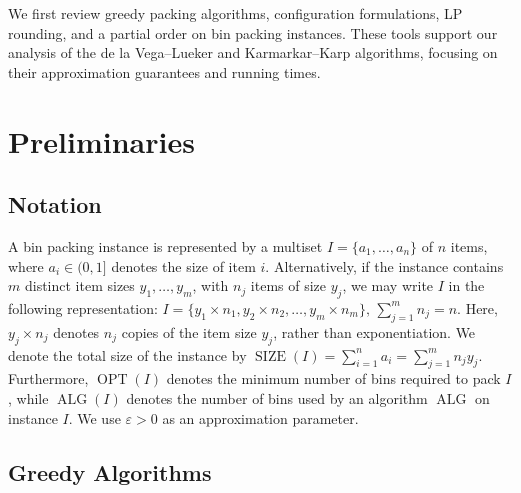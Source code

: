 \documentclass[11pt,a4paper,onecolumn]{article}
\theoremstyle{plain}
\newtheorem{theorem}{Theorem}[section]
\theoremstyle{definition}
\newtheorem{definition}[theorem]{Definition}
\theoremstyle{remark}
\newcommand{\eps}{\varepsilon}
\newcommand{\I}{\mathcal{I}}
\DeclareMathOperator{\OPT}{OPT}
\DeclareMathOperator{\ALG}{ALG}
\DeclareMathOperator{\SIZE}{SIZE}
\begin{document}
We first review greedy packing algorithms, configuration formulations,
LP rounding, and a partial order on bin packing instances. These tools
support our analysis of the de la Vega--Lueker and Karmarkar--Karp
algorithms, focusing on their approximation guarantees and running times.







\section{Preliminaries}

\subsection{Notation}

A bin packing instance is represented by a multiset
$I=\{a_1,\ldots,a_n\}$ of $n$ items, where
$a_i\in(0,1]$ denotes the size of item $i$.
Alternatively, if the instance contains $m$ distinct
item sizes $y_1,\ldots,y_m$, with $n_j$ items of size
$y_j$, we may write $I$ in the following representation:
$I=\{y_1 \times n_1 ,y_2 \times n_2,\ldots,y_m \times n_m\},
\, \sum_{j=1}^{m}n_j=n.$
Here, $y_j \times n_j$ denotes $n_j$ copies of the
item size $y_j$, rather than exponentiation.
We denote the total size of the instance by $\SIZE(I)=\sum_{i=1}^{n}a_i =\sum_{j=1}^{m}n_jy_j.$ Furthermore, $\OPT(I)$ denotes the minimum number
of bins required to pack $I$, while $\ALG(I)$
denotes the number of bins used by an algorithm
$\ALG$ on instance $I$. We use $\varepsilon>0$
as an approximation parameter.

\subsection{Greedy Algorithms}
\end{document}
